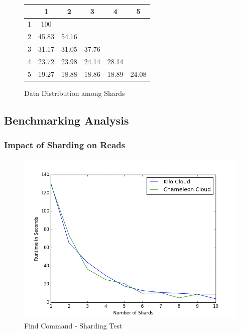 \documentclass[9pt,twocolumn,twoside]{styles/osajnl}
\begin{document}
\begin{figure}[ht]
\begin{center}
 \begin{tabular}{| c | c | c | c | c | c |} 
 \hline
  &  1    &  2    &  3    &   4   & 5 \\ [0.5ex]
\hline
  \hline
1 & 100   &       &       &       &   \\
\hline
2 & 45.83 & 54.16 &       &       &   \\
\hline
3 & 31.17 & 31.05 & 37.76 &       &   \\
\hline
4 & 23.72 & 23.98 & 24.14 & 28.14 &   \\
\hline
5 & 19.27 & 18.88 & 18.86 & 18.89 & 24.08   \\
\hline
\end{tabular}
\end{center}
  \caption{Data Distribution among Shards}
\end{figure}





\subsection{Benchmarking Analysis}

\subsubsection{Impact of Sharding on Reads}

\begin{figure}[!ht]
  \includegraphics[scale=0.45]{images/shard_find.png}
  \caption{Find Command - Sharding Test}
\end{figure}
\end{document}
